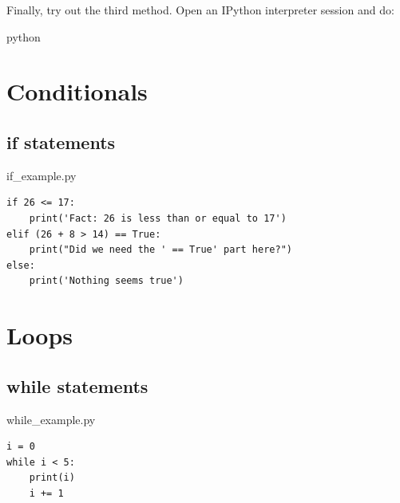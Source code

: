 \documentclass[aspectratio=1610,slidestop]{beamer}
\begin{document}
\begin{pframe}
 Finally, try out the third method. Open an IPython interpreter session and do:
 \begin{ipython}
  \begin{pythonin}{python}
  \end{pythonin}
 \end{ipython}
\end{pframe}


\section{Conditionals}

\subsection{if statements}
\begin{pframe}
 \begin{pythonfile}{if\_example.py}
  \begin{verbatim}
if 26 <= 17:
    print('Fact: 26 is less than or equal to 17')
elif (26 + 8 > 14) == True:
    print("Did we need the ' == True' part here?")
else:
    print('Nothing seems true')
  \end{verbatim}
 \end{pythonfile}

 \begin{terminal}
 \end{terminal}
\end{pframe}


\section{Loops}

\subsection{while statements}
\begin{pframe}
 \begin{pythonfile}{while\_example.py}
  \begin{verbatim}
i = 0
while i < 5:
    print(i)
    i += 1
  \end{verbatim}
 \end{pythonfile}

 \begin{terminal}
 \end{terminal}
\end{pframe}
\end{document}
